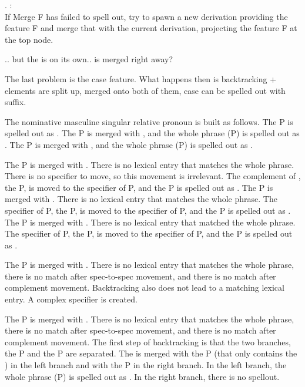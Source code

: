 \ex.  \citep{starke2018}:\\
If Merge F has failed to spell out, try to spawn a new derivation providing the feature F and merge that with the current derivation, projecting the feature F at the top node.\label{ex:specformation}

.. but the  is on its own.. is  merged right away?




The last problem is the case feature. What happens then is backtracking + elements are split up, merged onto both of them, case can be spelled out with suffix.





The nominative masculine singular relative pronoun is built as follows.
The P is spelled out as .
The P is merged with , and the whole phrase (P) is spelled out as .
The P is merged with , and the whole phrase (P) is spelled out as .

The P is merged with . There is no lexical entry that matches the whole phrase. There is no specifier to move, so this movement is irrelevant. The complement of , the P, is moved to the specifier of P, and the P is spelled out as .
The P is merged with . There is no lexical entry that matches the whole phrase. The specifier of P, the P, is moved to the specifier of P, and the P is spelled out as .
The P is merged with . There is no lexical entry that matched the whole phrase. The specifier of P, the P, is moved to the specifier of P, and the P is spelled out as .

The P is merged with . There is no lexical entry that matches the whole phrase, there is no match after spec-to-spec movement, and there is no match after complement movement. Backtracking also does not lead to a matching lexical entry. A complex specifier is created.

The P is merged with . There is no lexical entry that matches the whole phrase, there is no match after spec-to-spec movement, and there is no match after complement movement. The first step of backtracking is that the two branches, the P and the P are separated. The  is merged with the P (that only contains the ) in the left branch and with the P in the right branch. In the left branch, the whole phrase (P) is spelled out as . In the right branch, there is no spellout.

